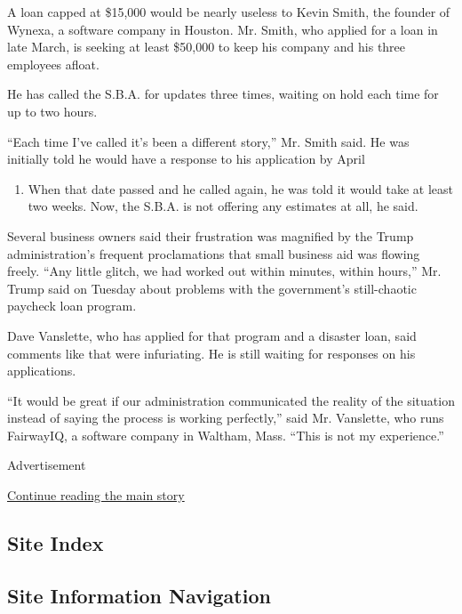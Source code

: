 A loan capped at \$15,000 would be nearly useless to Kevin Smith, the
founder of Wynexa, a software company in Houston. Mr. Smith, who applied
for a loan in late March, is seeking at least \$50,000 to keep his
company and his three employees afloat.

He has called the S.B.A. for updates three times, waiting on hold each
time for up to two hours.

``Each time I've called it's been a different story,'' Mr. Smith said.
He was initially told he would have a response to his application by
April

\begin{enumerate}
\def\labelenumi{\arabic{enumi}.}
\tightlist
\item
  When that date passed and he called again, he was told it would take
  at least two weeks. Now, the S.B.A. is not offering any estimates at
  all, he said.
\end{enumerate}

Several business owners said their frustration was magnified by the
Trump administration's frequent proclamations that small business aid
was flowing freely. ``Any little glitch, we had worked out within
minutes, within hours,'' Mr. Trump said on Tuesday about problems with
the government's still-chaotic paycheck loan program.

Dave Vanslette, who has applied for that program and a disaster loan,
said comments like that were infuriating. He is still waiting for
responses on his applications.

``It would be great if our administration communicated the reality of
the situation instead of saying the process is working perfectly,'' said
Mr. Vanslette, who runs FairwayIQ, a software company in Waltham, Mass.
``This is not my experience.''

Advertisement

\protect\hyperlink{after-bottom}{Continue reading the main story}

\hypertarget{site-index}{%
\subsection{Site Index}\label{site-index}}

\hypertarget{site-information-navigation}{%
\subsection{Site Information
Navigation}\label{site-information-navigation}}

